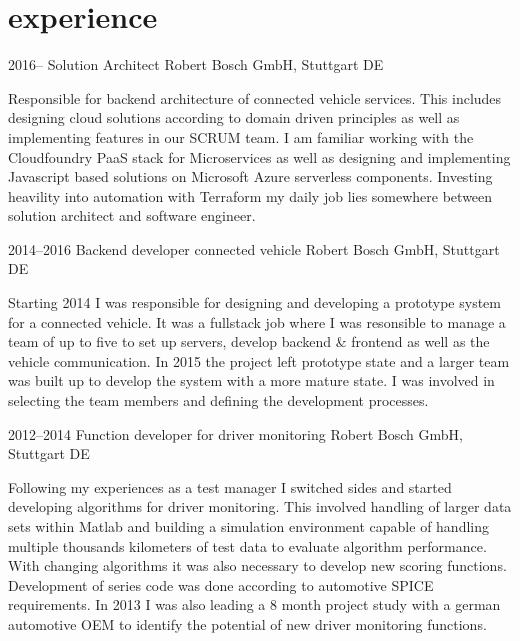 \documentclass[]{friggeri-cv} %
\begin{document}

\section{\color{orange}experience}

\begin{entrylist}


\entry
{2016--}
{Solution Architect}
{Robert Bosch GmbH, Stuttgart DE}
{Responsible for backend architecture of connected vehicle services. This includes designing cloud solutions according to domain driven principles as well as implementing features in our SCRUM team. I am familiar working with the Cloudfoundry PaaS stack for Microservices as well as designing and implementing Javascript based solutions on Microsoft Azure serverless components. Investing heavility into automation with Terraform my daily job lies somewhere between solution architect and software engineer.

}
\end{entrylist}
\begin{entrylist}
\entry
{2014--2016}
{Backend developer connected vehicle}
{Robert Bosch GmbH, Stuttgart DE}
{Starting 2014 I was responsible for designing and developing a prototype system for a connected vehicle. It was a fullstack job where I was resonsible to manage a team of up to five to set up servers, develop backend \& frontend as well as the vehicle communication. In 2015 the project left prototype state and a larger team was built up to develop the system with a more mature state. I was involved in selecting the team members and defining the development processes.

}
\end{entrylist}
\begin{entrylist}
\entry
{2012--2014}
{Function developer for driver monitoring}
{Robert Bosch GmbH, Stuttgart DE}
{Following my experiences as a test manager I switched sides and started developing algorithms for driver monitoring. This involved handling of larger data sets within Matlab and building a simulation environment capable of handling multiple thousands kilometers of test data to evaluate algorithm performance. With changing algorithms it was also necessary to develop new scoring functions. Development of series code was done according to automotive SPICE requirements. In 2013 I was also leading a 8 month project study with a german automotive OEM to identify the potential of new driver monitoring functions.

}
\end{entrylist}
\end{document}
